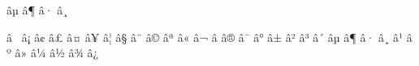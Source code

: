 \mubyte \aleph ^^e2^^84^^b5\endmubyte %
\mubyte \beth ^^e2^^84^^b6\endmubyte %
\mubyte \gimel ^^e2^^84^^b7\endmubyte %
\mubyte \daleth ^^e2^^84^^b8\endmubyte %

\mubyte \romannumI ^^e2^^85^^a0\endmubyte %
\mubyte \romannumII ^^e2^^85^^a1\endmubyte %
\mubyte \romannumIII ^^e2^^85^^a2\endmubyte %
\mubyte \romannumIV ^^e2^^85^^a3\endmubyte %
\mubyte \romannumV ^^e2^^85^^a4\endmubyte %
\mubyte \romannumVI ^^e2^^85^^a5\endmubyte %
\mubyte \romannumVII ^^e2^^85^^a6\endmubyte %
\mubyte \romannumVIII ^^e2^^85^^a7\endmubyte %
\mubyte \romannumIX ^^e2^^85^^a8\endmubyte %
\mubyte \romannumX ^^e2^^85^^a9\endmubyte %
\mubyte \romannumXI ^^e2^^85^^aa\endmubyte %
\mubyte \romannumXII ^^e2^^85^^ab\endmubyte %
\mubyte \romannumL ^^e2^^85^^ac\endmubyte %
\mubyte \romannumC ^^e2^^85^^ad\endmubyte %
\mubyte \romannumD ^^e2^^85^^ae\endmubyte %
\mubyte \romannumM ^^e2^^85^^af\endmubyte %
\mubyte \romannumi ^^e2^^85^^b0\endmubyte %
\mubyte \romannumii ^^e2^^85^^b1\endmubyte %
\mubyte \romannumiii ^^e2^^85^^b2\endmubyte %
\mubyte \romannumiv ^^e2^^85^^b3\endmubyte %
\mubyte \romannumv ^^e2^^85^^b4\endmubyte %
\mubyte \romannumvi ^^e2^^85^^b5\endmubyte %
\mubyte \romannumvii ^^e2^^85^^b6\endmubyte %
\mubyte \romannumviii ^^e2^^85^^b7\endmubyte %
\mubyte \romannumix ^^e2^^85^^b8\endmubyte %
\mubyte \romannumx ^^e2^^85^^b9\endmubyte %
\mubyte \romannumxi ^^e2^^85^^ba\endmubyte %
\mubyte \romannumxii ^^e2^^85^^bb\endmubyte %
\mubyte \romannuml ^^e2^^85^^bc\endmubyte %
\mubyte \romannumc ^^e2^^85^^bd\endmubyte %
\mubyte \romannumd ^^e2^^85^^be\endmubyte %
\mubyte \romannumm ^^e2^^85^^bf\endmubyte %

